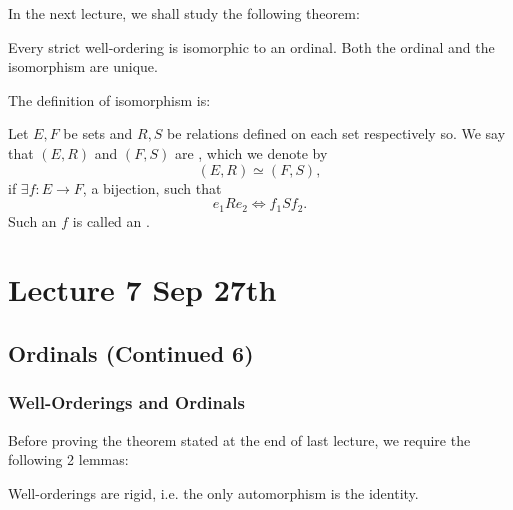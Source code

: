 \documentclass[notoc,notitlepage]{tufte-book}
\begin{document}

In the next lecture, we shall study the following theorem:

\begin{thmnonum}
  Every strict well-ordering is isomorphic to an ordinal. Both the ordinal and the isomorphism are unique.
\end{thmnonum}

The definition of isomorphism is:

\begin{defn}[Isomorphism]
\label{defn:isomorphism}
  Let $E, F$ be sets and $R, S$ be relations defined on each set respectively so. We say that $(E, R)$ and $(F, S)$ are , which we denote by
  \begin{equation*}
    (E, R) \simeq (F, S),
  \end{equation*}
  if $\exists f : E \to F$, a bijection, such that
  \begin{equation*}
    e_1 R e_2 \iff f_1 S f_2.
  \end{equation*}
  Such an $f$ is called an .
\end{defn}



\chapter{Lecture 7 Sep 27th}%
\label{chp:lecture_7_sep_27th}

\section{Ordinals (Continued 6)}%
\label{sec:ordinals_continued_6}

\subsection{Well-Orderings and Ordinals}%
\label{sub:well_orderings_and_ordinals}

Before proving the theorem stated at the end of last lecture, we require the following 2 lemmas:

\begin{lemma}
\label{lemma:rigidity_of_well_orderings}
  Well-orderings are rigid, i.e. the only automorphism is the identity.
\end{lemma}
\end{document}
